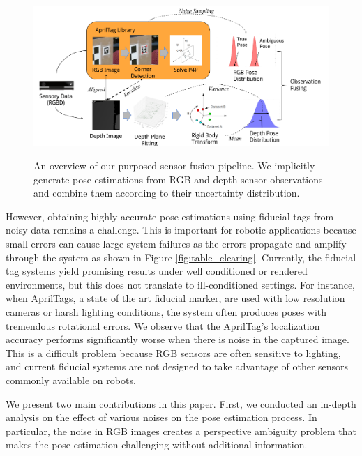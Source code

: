 \begin{figure}
\includegraphics[width=\columnwidth]{figs/pipeline} \\
\caption{An overview of our purposed sensor fusion pipeline. We implicitly generate pose estimations from RGB and depth sensor observations and combine them according to their uncertainty distribution.}
\label{fig:pipeline}
\end{figure}

However, obtaining highly accurate pose estimations using fiducial tags from noisy data remains a challenge. This is  important for robotic applications because small errors can cause large system failures as the errors propagate and amplify through the system as shown in Figure \ref{fig:table_clearing}. Currently, the fiducial tag systems yield promising results under well conditioned or rendered environments, but this does not translate to ill-conditioned settings. For instance, when AprilTags, a state of the art fiducial marker, are used with low resolution cameras or harsh lighting conditions, the system often produces poses with tremendous rotational errors. We observe that the AprilTag's localization accuracy performs significantly worse when there is noise in the captured image. This is a difficult problem because RGB sensors are often sensitive to lighting, and current fiducial systems are not designed to take advantage of other sensors commonly available on robots.

We present two main contributions in this paper. First, we conducted an in-depth analysis on the effect of various noises on the pose estimation process. In particular, the noise in RGB images creates a perspective ambiguity problem that makes the pose estimation challenging without additional information. 

